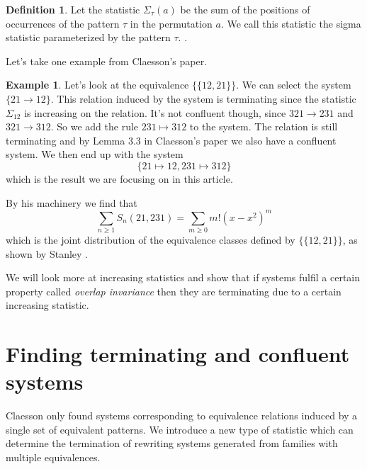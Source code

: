 \documentclass[a4paper, 11pt, english]{article}
\newcommand{\patternrule}{ \mapsto \!}
\theoremstyle{definition}
\newtheorem{definition}[theorem]{Definition}
\newtheorem{example}[theorem]{Example}
\newcommand{\Sym}{S}
\begin{document}
\begin{definition}
    Let the statistic $\Sigma_\tau(a)$ be the sum of the positions of occurrences of
    the pattern $\tau$ in the permutation $a$. We call this statistic the sigma statistic
    parameterized by the pattern $\tau$.
    \cite{claesson:2021}.
\end{definition}

Let's take one example from Claesson's paper.
\begin{example}
    Let's look at the equivalence $\{ \{ 12, 21 \} \}$. We can select the system $\{
        21 \to 12 \}$. This relation induced by the system is terminating since the statistic
    $\Sigma_{12}$ is increasing on the relation. It's not
    confluent though, since $321 \to 231$ and $321 \to 312$. So we add the rule
    $231 \patternrule 312$ to the system. The relation is still terminating and by Lemma
    3.3 in Claesson's paper we also have a confluent system. We then end up with
    the system 
    \[
        \{ 21 \patternrule 12, 231 \patternrule 312 \}
    \]
    which is the result we are focusing on in this article.

    By his machinery we find that 
    \[
        \sum_{n \geq 1} \Sym_n(21, 231) = \sum_{m \geq 0} m!(x-x^2)^m
    \]
    which is the joint distribution of the equivalence classes defined by 
    $\{ \{ 12, 21 \} \}$, as shown by Stanley \cite{stanley:2012}.
\end{example}

We will look more at increasing statistics and show that if systems fulfil a certain property called
\emph{overlap invariance} then they are terminating due to a certain increasing statistic.

\section{Finding terminating and confluent systems}
Claesson only found systems corresponding to equivalence relations induced by a
single set of equivalent patterns. We introduce a new type of statistic which can determine the
termination of rewriting systems generated from families with multiple equivalences.
\end{document}
